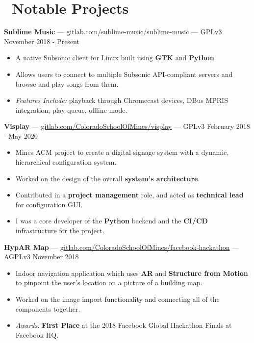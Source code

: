 \documentclass[10pt,letterpaper]{article}
\begin{document}
\section*{\faCode\ Notable Projects}
\textbf{Sublime Music} ---
\href{https://gitlab.com/sublime-music/sublime-music}{gitlab.com/sublime-music/sublime-music}
--- GPLv3 \hfill November 2018 - Present
\begin{itemize}
    \item A native Subsonic client for Linux built using \textbf{GTK} and
        \textbf{Python}.
    \item Allows users to connect to multiple Subsonic API-compliant servers and
        browse and play songs from them.
    \item \textit{Features Include:} playback through Chromecast devices, DBus
        MPRIS integration, play queue, offline mode.
\end{itemize}

\textbf{Visplay} ---
\href{https://gitlab.com/ColoradoSchoolOfMines/visplay}{gitlab.com/ColoradoSchoolOfMines/visplay}
--- GPLv3 \hfill February 2018 - May 2020
\begin{itemize}
    \item Mines ACM project to create a digital signage system with a dynamic,
        hierarchical configuration system.
    \item Worked on the design of the overall \textbf{system's architecture}.
    \item Contributed in a \textbf{project management} role, and acted as
        \textbf{technical lead} for configuration GUI.
    \item I was a core developer of the \textbf{Python} backend and the
        \textbf{CI/CD} infrastructure for the project.
\end{itemize}

\textbf{HypAR Map} ---
\href{https://gitlab.com/ColoradoSchoolOfMines/facebook-hackathon}{gitlab.com/ColoradoSchoolOfMines/facebook-hackathon}
--- AGPLv3 \hfill November 2018
\begin{itemize}
    \item Indoor navigation application which uses \textbf{AR} and
        \textbf{Structure from Motion} to pinpoint the user's location on a
        picture of a building map.
    \item Worked on the image import functionality and connecting all of the
        components together.
    \item \textit{Awards:} \textbf{First Place} at the 2018 Facebook Global
        Hackathon Finals at Facebook HQ.
\end{itemize}
\end{document}
